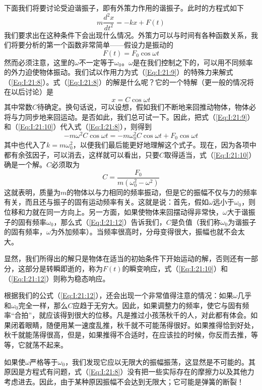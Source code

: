 下面我们将要讨论受迫谐振子，即有外策力作用的谐振子。此时的方程式如下
\begin{equation}
    \label{Eq:I:21:8}
    m\frac{d^2x}{dt^2}=-kx+F(t)
\end{equation}
我们要求出在这种条件下会出现什么情况。外策力可以与时间有各种函数关系，我们将要分析的第一个函数非常简单——假设力是振动的
\begin{equation}
    \label{Eq:I:21:9}
    F(t)=F_0\cos\omega t
\end{equation}
然而必须注意，这里的$\omega$不一定等于$\omega_0$。$\omega$是在我们控制之下的，可以用不同频率的外力迫使物体振动。我们试以作用力为式（\ref{Eq:I:21:9}）的特殊力来解式（\ref{Eq:I:21:8}）。式（\ref{Eq:I:21:8}）的解是什么呢？它的一个特解（更一般的情况将在以后讨论）是
\begin{equation}
    \label{Eq:I:21:10}
    x=C\cos\omega t
\end{equation}
其中常数$C$待确定。换句话说，可以设想，假如我们不断地来回推动物体，物体必将与力同步地来回运动。是否如此，我们总可试一下。因此，把式（\ref{Eq:I:21:9}）和（\ref{Eq:I:21:10}）代入式（\ref{Eq:I:21:8}），则得到
\begin{equation}
    \label{Eq:I:21:11}
    -m\omega^2C\cos\omega t = -m\omega_0^2 C\cos\omega t + F_0\cos\omega t
\end{equation}
其中也代入了$k=m\omega_0^2$，以便我们最后能更好地理解这个式子。现在，因为各项中都有余弦因子，可以消去，这样就可以看出，只要$C$取得适当，式（\ref{Eq:I:21:10}）确是一个解。$C$必须取为
\begin{equation}
    \label{Eq:I:21:12}
    C=\frac{F_0}{m(\omega_0^2 - \omega^2)}
\end{equation}
这就表明，质量为$m$的物体以与力相同的频率振动，但是它的振幅不仅与力的频率有关，而且还与振子的固有运动频率有关。这就是说：首先，假如$\omega$远小于$\omega_0$，则位移和力就在同一方向上。另一方面，如果使物体来回摆动得非常快，$\omega$大于谐振子的固有频率$\omega_0$，那么式（\ref{Eq:I:21:12}）告诉我们，$C$是负值（我们称$\omega_0$为谐振子的固有频率，$\omega$为外加频率）。当频率很高时，分母变得很大，振幅也就不会太大。

显然，我们所得出的解只是物体在适当的初始条件下开始运动的解，否则还有一部分，这部分是转瞬即逝的，称为$F(t)$的瞬变响应，式（\ref{Eq:I:21:10}）和（\ref{Eq:I:21:12}）则称为稳态响应。

根据我们的公式（\ref{Eq:I:21:12}），还会出现一个非常值得注意的情况：如果$\omega$几乎和$\omega_0$完全一样，那么$C$应趋于无穷大。因此，如果调整力的频率，使它与固有频率“合拍”，就应该得到很大的位移。凡是推过小孩荡秋千的人，对此都有体会。如果闭着眼睛，随便用某一速度乱推，秋千就不可能荡得很好。如果推得恰到好处，秋千就能荡得很高，但是，如果推得不合适时，在应该拉的时候，你反而去推，等等，它就荡不起来。

如果使$\omega$严格等于$\omega_0$，我们发现它应以无限大的振幅振荡，这显然是不可能的。其原因是方程式有问题，式（\ref{Eq:I:21:8}）没有把一些实际存在的摩擦力以及其他力考虑进去。因此，由于某种原因振幅不会达到无限大；它可能是弹簧的断裂！